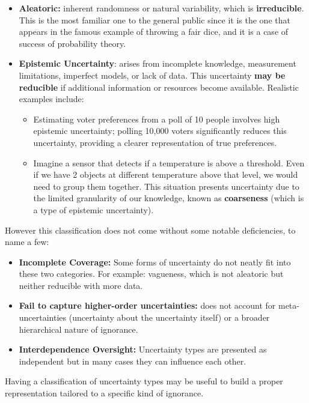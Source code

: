\begin{itemize}
    \item \textbf{Aleatoric:} inherent randomness or natural variability, which is \textbf{irreducible}. This is the most familiar one to the general public since it is the one that appears in the famous example of throwing a fair dice, and it is a case of success of probability theory.
    \item \textbf{Epistemic Uncertainty}: arises from incomplete knowledge, measurement limitations, imperfect models, or lack of data. This uncertainty \textbf{may be reducible} if additional information or resources become available. Realistic examples include: 
    \begin{itemize} 
        \item Estimating voter preferences from a poll of 10 people involves high epistemic uncertainty; polling 10,000 voters significantly reduces this uncertainty, providing a clearer representation of true preferences. 
        \item Imagine a sensor that detects if a temperature is above a threshold. Even if we have 2 objects at different temperature above that level, we would need to group them together. This situation presents uncertainty due to the limited granularity of our knowledge, known as \textbf{coarseness} (which is a type of epistemic uncertainty).
    \end{itemize} 
\end{itemize}

However this classification does not come without some notable deficiencies, to name a few:

\begin{itemize}
    \item \textbf{Incomplete Coverage:} Some forms of uncertainty do not neatly fit into these two categories. For example: vagueness, which is not aleatoric but neither reducible with more data.
    \item \textbf{Fail to capture higher-order uncertainties:} does not account for meta-uncertainties (uncertainty about the uncertainty itself) or a broader hierarchical nature of ignorance.
    \item \textbf{Interdependence Oversight:} Uncertainty types are presented as independent but in many cases they can influence each other.
\end{itemize}

Having a classification of uncertainty types may be useful to build a proper representation tailored to a specific kind of ignorance.


